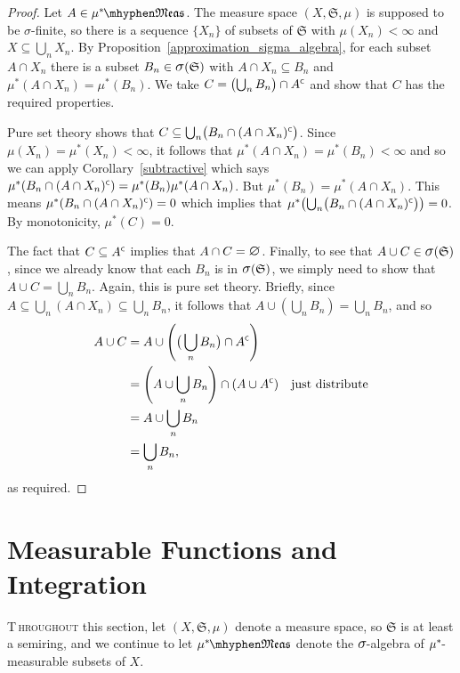 \documentclass[
twoside=true,
paper=letter,
fontsize=9pt,
pagesize=auto,
leqno,
openany,
headsepline,
overfullrule,
]{scrbook}
\theoremstyle{plain}
\theoremstyle{plain}
\theoremstyle{definition}
\theoremstyle{bfnoteitalic}
\theoremstyle{bfnoteroman}
\newcommand{\sigalg}[1]{\mathfrak{#1}}
\newcommand{\sagb}{\mathop{\hbox{\large{$\sigma$}}}\nolimits}
\newcommand{\textsigma}{\hbox{\large{$\sigma$}}\kern-1pt}
\newcommand{\mtset}{\hbox{\large{$\varnothing$}}}
\newcommand{\comp}{^{\hbox{\tiny{$\mathsf C$}}}}
\newcommand{\meets}{\cap}
\newcommand{\semiring}{\sigalg{S}}
\newcommand{\measurable}[1]{{#1}\mhyphen\mathfrak{Meas}}
\newcommand{\kernast}{\ast\kern-1pt}
\newcommand{\measurespace}{X}
\newcommand{\measure}{\mu}
\begin{document}
\begin{proof}
Let $A\in\measurable{\measure^\kernast}$.
The measure space  $(\measurespace, \semiring, \measure)$ is supposed to be \textsigma-finite, so there is a sequence $\{ \measurespace_n \}$ of subsets of $\semiring$ with  $\measure(\measurespace_n) < \infty$ 
and $\measurespace\subseteq\bigcup_n\measurespace_n$. 
By Proposition~\ref{approximation_sigma_algebra}, for each subset $A\meets \measurespace_n$ there is a subset $B_n\in\sagb(\semiring)$ with $A\meets\measurespace_n\subseteq B_n$ and $\measure^*(A\meets\measurespace_n) = \measure^*(B_n)$. 
We take $C=\bigl( \bigcup_n B_n \bigr) \meets A\comp$ and show that $C$ has the required properties.

Pure set theory shows that 
$C\subseteq \bigcup_n \bigl(B_n \meets (A\meets\measurespace_n)\comp\bigr)$. 
Since $\measure(\measurespace_n) = \measure^*(\measurespace_n)< \infty$, it follows that 
$\measure^*(A\meets\measurespace_n)=\measure^*(B_n) < \infty $ and so we can apply Corollary~\ref{subtractive} which says 
$\measure^*(B_n \meets (A\meets\measurespace_n)\comp)
=\measure^*(B_n)   \measure^*(A\meets\measurespace_n)$. But $\measure^*(B_n) = \measure^*(A\meets\measurespace_n)$. 
This means $\measure^*(B_n \meets (A\meets\measurespace_n)\comp)=0$
which implies that $\measure^*\bigl(\bigcup_n \bigl(B_n \meets (A\meets\measurespace_n)\comp\bigr) \bigr)=0$. By monotonicity, $\measure^*(C)=0$.

The fact that $C\subseteq A\comp$ implies that $A\meets C =\mtset$.
Finally, to see that $A\cup C\in\sagb(\semiring)$, since we already know that each $B_n$ is in $\sagb(\semiring)$, we simply need to show that $A\cup C = \bigcup_n B_n$. Again, this is pure set theory. Briefly, since $A\subseteq \bigcup_n(A\meets \measurespace_n) \subseteq \bigcup_n B_n$, it follows that $A\cup (\bigcup_n B_n) = \bigcup_n B_n$, and so 
\begin{align*}
A\cup C & = A \cup \left( \bigl(\, \bigcup_n B_n \bigr ) \meets A\comp\right)\\
& = \left( A\cup \bigcup_n B_n \right) \meets (A\cup A\comp)
\quad\text{just distribute}\\
& = A \cup \bigcup_n B_n \\
& = \bigcup_n B_n,
\end{align*}
as required.
\end{proof}





\chapter{Measurable Functions and Integration}
\lettrine{T}{\,hroughout} this section, let $(\measurespace, \semiring, \measure)$ denote a measure space, so $\semiring$ is at least a semiring, and we continue to let $\measurable{\measure^\kernast}$ denote the $\textsigma$-algebra of  $\measure^\kernast$-measurable subsets of $\measurespace$. 
\end{document}
